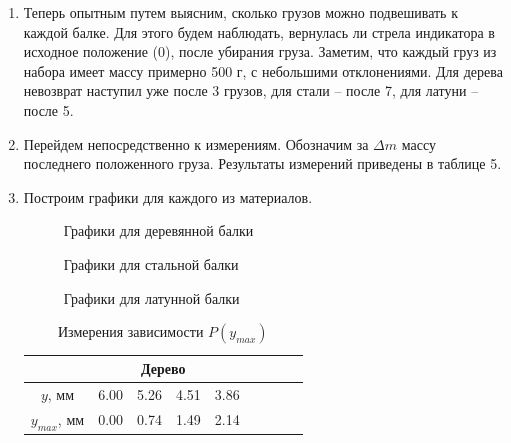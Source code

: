 \documentclass[12pt]{article}
\begin{document}
\begin{enumerate}
        \item Теперь опытным путем выясним, сколько грузов можно подвешивать
        к каждой балке. Для этого будем наблюдать, вернулась ли стрела индикатора
        в исходное положение (0), после убирания груза. Заметим, что каждый груз
        из набора имеет массу примерно 500 г, с небольшими отклонениями.
        Для дерева невозврат наступил уже после 3 грузов, для стали -- после 7,
        для латуни -- после 5.
        \item Перейдем непосредственно к измерениям. Обозначим за $\Delta m$ массу
        последнего положенного груза. Результаты измерений приведены
        в таблице 5.
        \item Построим графики для каждого из материалов.
        \begin{figure}[H]
            \centering
            \caption{Графики для деревянной балки}
            
        \end{figure}
        \begin{figure}[H]
            \centering
            \caption{Графики для стальной балки}
            
        \end{figure}
        \begin{figure}[H]
            \centering
            \caption{Графики для латунной балки}
            
        \end{figure}
        \begin{table}
            \centering
            \caption{Измерения зависимости $P(y_{max})$}
            \begin{tabular}{|ccccccccc|}
            \hline
            \multicolumn{9}{|c|}{Дерево}                                                                                                                                                                                                                          \\ \hline
            \multicolumn{1}{|c|}{$y$, мм}       & \multicolumn{1}{c|}{6.00} & \multicolumn{1}{c|}{5.26}  & \multicolumn{1}{c|}{4.51}  & \multicolumn{1}{c|}{3.86}  & \multicolumn{1}{c|}{}      & \multicolumn{1}{c|}{}      & \multicolumn{1}{c|}{}      &       \\ \hline
            \multicolumn{1}{|c|}{$y_{max}$, мм} & \multicolumn{1}{c|}{0.00} & \multicolumn{1}{c|}{0.74}  & \multicolumn{1}{c|}{1.49}  & \multicolumn{1}{c|}{2.14}  & \multicolumn{1}{c|}{}      & \multicolumn{1}{c|}{}      & \multicolumn{1}{c|}{}      &       \\ \hline

\end{tabular}
\end{table}
\end{enumerate}
\end{document}
